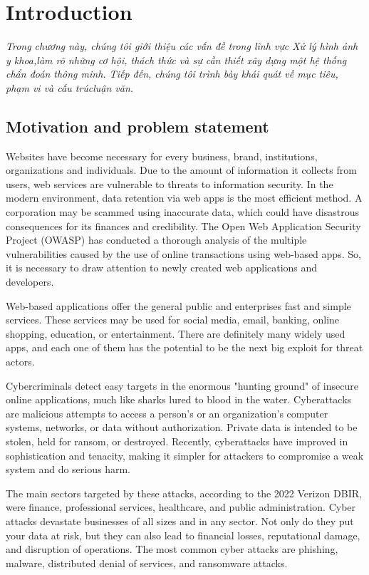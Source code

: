 \chapter{Introduction}
\label{chap:introduction}
	\textit{Trong chương này, chúng tôi giới thiệu các vấn đề trong lĩnh vực Xử lý hình ảnh y khoa,\linebreak làm rõ những cơ hội, thách thức và sự cần thiết xây dựng một hệ thống chẩn đoán thông minh. Tiếp đến, chúng tôi trình bày khái quát về mục tiêu, phạm vi và cấu trúc\linebreak luận văn.}
\minitoc

\section{Motivation and problem statement}
\label{sec:motivation}
Websites have become necessary for every business, brand, institutions, organizations and individuals. Due to the amount of information it collects from users, web services are vulnerable to threats to information security. In the modern environment, data retention via web apps is the most efficient method. A corporation may be scammed using inaccurate data, which could have disastrous consequences for its finances and credibility. The Open Web Application Security Project (OWASP) has conducted a thorough analysis of the multiple vulnerabilities caused by the use of online transactions using web-based apps. So, it is necessary to draw attention to newly created web applications and developers.

Web-based applications offer the general public and enterprises fast and simple services. These services may be used for social media, email, banking, online shopping, education, or entertainment. There are definitely many widely used apps, and each one of them has the potential to be the next big exploit for threat actors.

Cybercriminals detect easy targets in the enormous "hunting ground" of insecure online applications, much like sharks lured to blood in the water. Cyberattacks are malicious attempts to access a person's or an organization's computer systems, networks, or data without authorization. Private data is intended to be stolen, held for ransom, or destroyed. Recently, cyberattacks have improved in sophistication and tenacity, making it simpler for attackers to compromise a weak system and do serious harm.

The main sectors targeted by these attacks, according to the 2022 Verizon DBIR, were finance, professional services, healthcare, and public administration. Cyber attacks devastate businesses of all sizes and in any sector. Not only do they put your data at risk, but they can also lead to financial losses, reputational damage, and disruption of operations. The most common cyber attacks are phishing, malware, distributed denial of services, and ransomware attacks. 

